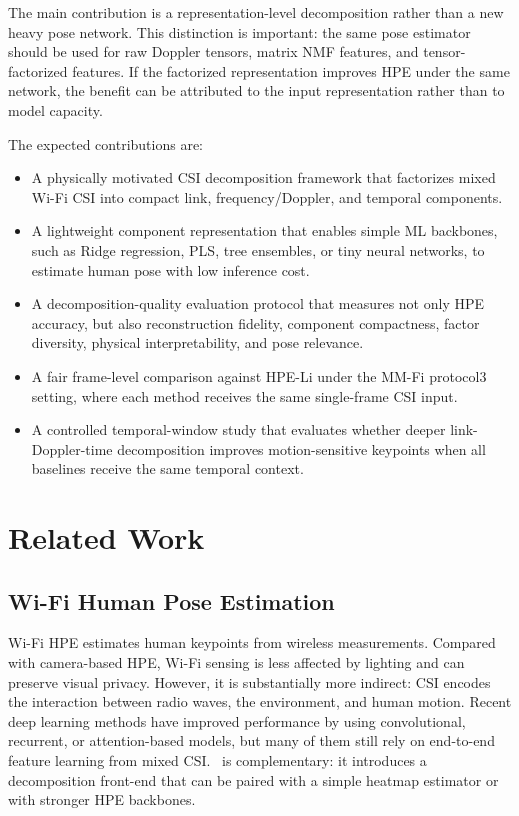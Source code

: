 \documentclass[10pt,journal]{IEEEtran}
\newcommand{\method}{\mathtt{DePose\mbox{-}Fi}}
\begin{document}
The main contribution is a representation-level decomposition rather than a new heavy pose network. This distinction is important: the same pose estimator should be used for raw Doppler tensors, matrix NMF features, and tensor-factorized features. If the factorized representation improves HPE under the same network, the benefit can be attributed to the input representation rather than to model capacity.

The expected contributions are:
\begin{itemize}
    \item A physically motivated CSI decomposition framework that factorizes mixed Wi-Fi CSI into compact link, frequency/Doppler, and temporal components.
    \item A lightweight component representation that enables simple ML backbones, such as Ridge regression, PLS, tree ensembles, or tiny neural networks, to estimate human pose with low inference cost.
    \item A decomposition-quality evaluation protocol that measures not only HPE accuracy, but also reconstruction fidelity, component compactness, factor diversity, physical interpretability, and pose relevance.
    \item A fair frame-level comparison against HPE-Li under the MM-Fi protocol3 setting, where each method receives the same single-frame CSI input.
    \item A controlled temporal-window study that evaluates whether deeper link-Doppler-time decomposition improves motion-sensitive keypoints when all baselines receive the same temporal context.
\end{itemize}

\section{Related Work}

\subsection{Wi-Fi Human Pose Estimation}

Wi-Fi HPE estimates human keypoints from wireless measurements. Compared with camera-based HPE, Wi-Fi sensing is less affected by lighting and can preserve visual privacy. However, it is substantially more indirect: CSI encodes the interaction between radio waves, the environment, and human motion. Recent deep learning methods have improved performance by using convolutional, recurrent, or attention-based models, but many of them still rely on end-to-end feature learning from mixed CSI. \method\ is complementary: it introduces a decomposition front-end that can be paired with a simple heatmap estimator or with stronger HPE backbones.
\end{document}
